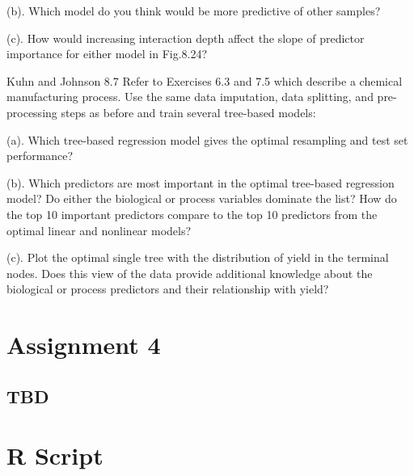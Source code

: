 \documentclass[]{report}
\begin{document}
\begin{subquestion}{(b).} Which model do you think would be more predictive of other samples?\end{subquestion}

\begin{subquestion}{(c).} How would increasing interaction depth affect the slope of predictor importance for either model in Fig.8.24?\end{subquestion}


\begin{question}{Kuhn and Johnson 8.7}
Refer to Exercises 6.3 and 7.5 which describe a chemical manufacturing process. Use the same data imputation, data splitting, and pre-processing steps as before and train several tree-based models:
\end{question}

\begin{subquestion}{(a).} Which tree-based regression model gives the optimal resampling and test set performance? \end{subquestion}

\begin{subquestion}{(b).} Which predictors are most important in the optimal tree-based regression model? Do either the biological or process variables dominate the list? How do the top 10 important predictors compare to the top 10 predictors from the optimal linear and nonlinear models?\end{subquestion}

\begin{subquestion}{(c).} Plot the optimal single tree with the distribution of yield in the terminal nodes. Does this view of the data provide additional knowledge about the biological or process predictors and their relationship with yield?\end{subquestion}

\hypertarget{AS-4}{%
\chapter*{Assignment 4}\label{AS-4}}

\hypertarget{tbd}{%
\section{TBD}\label{tbd}}

\hypertarget{R-Script}{%
\chapter*{R Script}\label{R-Script}}
\end{document}
